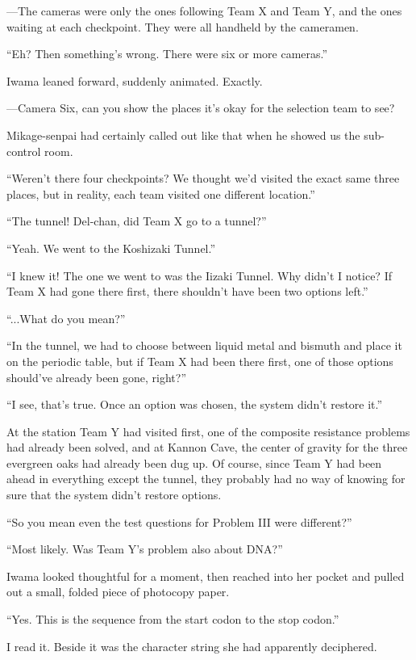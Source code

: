 \documentclass[
    a4paper,
    12pt,
    twoside,
    openany,
    UTF8,
    fontset=windows
]{ctexbook}
\begin{document}
---The cameras were only the ones following Team X and Team Y, and the ones waiting at each checkpoint. They were all handheld by the cameramen.

``Eh? Then something's wrong. There were six or more cameras.''

Iwama leaned forward, suddenly animated. Exactly.

---Camera Six, can you show the places it's okay for the selection team to see?

Mikage-senpai had certainly called out like that when he showed us the sub-control room.

``Weren't there four checkpoints? We thought we'd visited the exact same three places, but in reality, each team visited one different location.''

``The tunnel! Del-chan, did Team X go to a tunnel?''

``Yeah. We went to the Koshizaki Tunnel.''

``I knew it! The one we went to was the Iizaki Tunnel. Why didn't I notice? If Team X had gone there first, there shouldn't have been two options left.''

``...What do you mean?''

``In the tunnel, we had to choose between liquid metal and bismuth and place it on the periodic table, but if Team X had been there first, one of those options should've already been gone, right?''

``I see, that's true. Once an option was chosen, the system didn't restore it.''

At the station Team Y had visited first, one of the composite resistance problems had already been solved, and at Kannon Cave, the center of gravity for the three evergreen oaks had already been dug up. Of course, since Team Y had been ahead in everything except the tunnel, they probably had no way of knowing for sure that the system didn't restore options.

``So you mean even the test questions for Problem III were different?''

``Most likely. Was Team Y's problem also about DNA?''

Iwama looked thoughtful for a moment, then reached into her pocket and pulled out a small, folded piece of photocopy paper.

``Yes. This is the sequence from the start codon to the stop codon.''

I read it. Beside it was the character string she had apparently deciphered.
\end{document}
